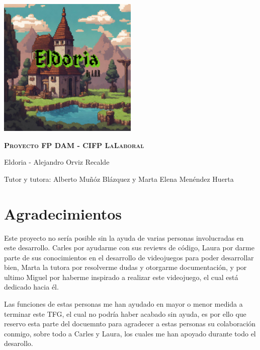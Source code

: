 \documentclass[a4paper]{article}
\begin{document}
\begin{titlepage}
    \centering %
    \includegraphics[width=0.5\textwidth]{Images/Eldoria.png}\par
    \vspace{0.4cm}
    {\scshape\LARGE\textbf{Proyecto FP DAM - CIFP LaLaboral}\par} %
    \vspace{0.4cm}
    {\LARGE\textcolor{bluePortada}{Eldoria - Alejandro Orviz Recalde}\par}
    \vspace{0.2cm} 
    {\Large Tutor y tutora: Alberto Muñóz Blázquez y Marta Elena Menéndez Huerta\par}
\end{titlepage}
\clearpage

\tableofcontents
\clearpage

\listoffigures
\clearpage

\listoftables
\clearpage
\section{Agradecimientos}
Este proyecto no sería posible sin la ayuda de varias personas involucradas en este desarrollo. Carles por ayudarme con sus reviews de código,
Laura por darme parte de sus conocimientos en el desarrollo de videojuegos para poder desarrollar bien, Marta la tutora por resolverme dudas y otorgarme
documentación, y por ultimo Miguel por haberme inspirado a realizar este videojuego, el cual está dedicado hacia él.

Las funciones de estas personas me han ayudado en mayor o menor medida a terminar este TFG, el cual no podría haber acabado sin ayuda, es por ello que reservo
esta parte del docuemnto para agradecer a estas personas su colaboración conmigo, sobre todo a Carles y Laura, los cuales me han apoyado durante todo el desarollo.
\end{document}
